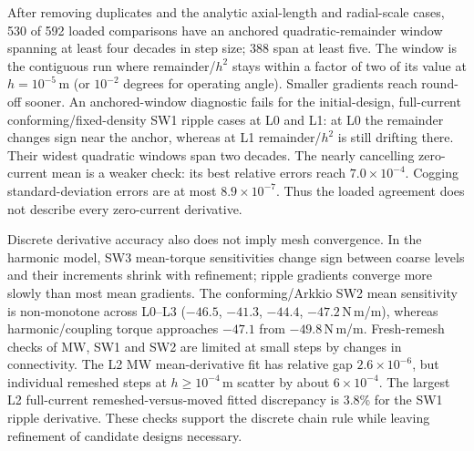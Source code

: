 \documentclass{anvil-paper}
\begin{document}
After removing duplicates and the analytic axial-length and radial-scale
cases, 530 of 592 loaded comparisons have an anchored quadratic-remainder
window spanning at least four decades in step size; 388 span at least five.
The window is the contiguous run where remainder/$h^2$ stays within a
factor of two of its value at $h=10^{-5}$\,m (or $10^{-2}$ degrees for
operating angle). Smaller gradients reach round-off sooner. An anchored-window diagnostic fails for the initial-design, full-current
conforming/fixed-density SW1 ripple cases at L0 and L1: at L0 the
remainder changes sign near the anchor, whereas at L1 remainder/$h^2$ is
still drifting there. Their widest quadratic windows span two decades. The nearly cancelling
zero-current mean is a weaker check: its best relative errors reach
$7.0\times10^{-4}$. Cogging standard-deviation errors are at most
$8.9\times10^{-7}$. Thus the loaded agreement does not describe every
zero-current derivative.

Discrete derivative accuracy also does not imply mesh convergence. In the
harmonic model, SW3 mean-torque sensitivities change sign between coarse
levels and their increments shrink with refinement; ripple gradients converge
more slowly than most mean gradients. The conforming/Arkkio SW2 mean
sensitivity is non-monotone across L0--L3 ($-46.5$, $-41.3$, $-44.4$,
$-47.2$\,N\,m/m), whereas harmonic/coupling torque approaches $-47.1$
from $-49.8$\,N\,m/m. Fresh-remesh checks of MW, SW1 and SW2 are limited
at small steps by changes in connectivity. The L2 MW mean-derivative fit
has relative gap $2.6\times10^{-6}$, but individual remeshed steps at
$h\geq10^{-4}$\,m scatter by about $6\times10^{-4}$. The largest L2 full-current
remeshed-versus-moved fitted discrepancy is 3.8\% for the SW1 ripple
derivative. These checks support the discrete chain rule while leaving
refinement of candidate designs necessary.
\end{document}
